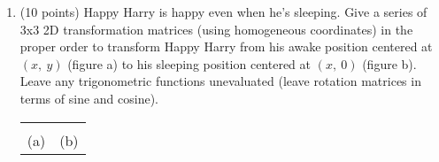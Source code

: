 \documentclass[13pt]{letter}
\begin{document}
\begin{enumerate}
	\vspace{13pt}
	
	\item (10 points)
	Happy Harry is happy even when he's sleeping. Give a series of 3x3 2D transformation matrices (using homogeneous coordinates) in the proper order to transform Happy Harry from his awake position centered at $(x,~y)$ (figure a) to his sleeping position centered at $(x,~0)$ (figure b).
	Leave any trigonometric functions unevaluated (leave rotation matrices in terms of sine and cosine).

	\begin{tabularx}{\textwidth}{C C}
		 &
		 \\
		(a) & (b) \\
	\end{tabularx}


\end{enumerate}
\end{document}
